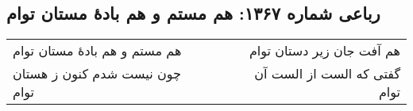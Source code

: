 \begin{center}
\section*{رباعی شماره ۱۳۶۷: هم مستم و هم بادهٔ مستان توام}
\label{sec:1367}
\begin{longtable}{l p{0.5cm} r}
هم مستم و هم بادهٔ مستان توام
&&
هم آفت جان زیر دستان توام
\\
چون نیست شدم کنون ز هستان توام
&&
گفتی که الست از الست آن توام
\\
\end{longtable}
\end{center}
